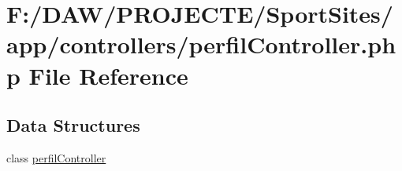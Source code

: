 \hypertarget{perfil_controller_8php}{}\section{F\+:/\+D\+A\+W/\+P\+R\+O\+J\+E\+C\+T\+E/\+Sport\+Sites/app/controllers/perfil\+Controller.php File Reference}
\label{perfil_controller_8php}
\subsection*{Data Structures}
\begin{DoxyCompactItemize}
\item 
class \hyperlink{classperfil_controller}{perfil\+Controller}
\end{DoxyCompactItemize}

